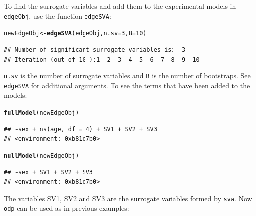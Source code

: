 \documentclass{article}\usepackage[]{graphicx}\usepackage[]{color}
\makeatletter
\newcommand{\hlnum}[1]{\textcolor[rgb]{0.686,0.059,0.569}{#1}}%
\newcommand{\hlstd}[1]{\textcolor[rgb]{0.345,0.345,0.345}{#1}}%
\newcommand{\hlkwb}[1]{\textcolor[rgb]{0.69,0.353,0.396}{#1}}%
\newcommand{\hlkwc}[1]{\textcolor[rgb]{0.333,0.667,0.333}{#1}}%
\newcommand{\hlkwd}[1]{\textcolor[rgb]{0.737,0.353,0.396}{\textbf{#1}}}%
\newenvironment{kframe}{%
 \def\at@end@of@kframe{}%
 \ifinner\ifhmode%
  \def\at@end@of@kframe{\end{minipage}}%
  \begin{minipage}{\columnwidth}%
 \fi\fi%
 \def\FrameCommand##1{\hskip\@totalleftmargin \hskip-\fboxsep
 \colorbox{shadecolor}{##1}\hskip-\fboxsep
     \hskip-\linewidth \hskip-\@totalleftmargin \hskip\columnwidth}%
 \MakeFramed {\advance\hsize-\width
   \@totalleftmargin\z@ \linewidth\hsize
   \@setminipage}}%
 {\par\unskip\endMakeFramed%
 \at@end@of@kframe}
\newenvironment{knitrout}{}{} %
\makeatother
\begin{document}
To find the surrogate variables and add them to the experimental models in {\tt edgeObj}, use the function {\tt edgeSVA}:
\begin{knitrout}
\color{fgcolor}\begin{kframe}
\begin{alltt}
\hlstd{newEdgeObj} \hlkwb{<-} \hlkwd{edgeSVA}\hlstd{(edgeObj,} \hlkwc{n.sv} \hlstd{=} \hlnum{3}\hlstd{,} \hlkwc{B} \hlstd{=} \hlnum{10}\hlstd{)}
\end{alltt}
\begin{verbatim}
## Number of significant surrogate variables is:  3 
## Iteration (out of 10 ):1  2  3  4  5  6  7  8  9  10
\end{verbatim}
\end{kframe}
\end{knitrout}
{\tt n.sv} is the number of surrogate variables and {\tt B} is the number of bootstraps. See {\tt edgeSVA} for additional arguments. To see the terms that have been added to the models:
\begin{knitrout}
\color{fgcolor}\begin{kframe}
\begin{alltt}
\hlkwd{fullModel}\hlstd{(newEdgeObj)}
\end{alltt}
\begin{verbatim}
## ~sex + ns(age, df = 4) + SV1 + SV2 + SV3
## <environment: 0xb81d7b0>
\end{verbatim}
\begin{alltt}
\hlkwd{nullModel}\hlstd{(newEdgeObj)}
\end{alltt}
\begin{verbatim}
## ~sex + SV1 + SV2 + SV3
## <environment: 0xb81d7b0>
\end{verbatim}
\end{kframe}
\end{knitrout}
The variables SV1, SV2 and SV3 are the surrogate variables formed by {\tt sva}. Now {\tt odp} can be used as in previous examples:
\end{document}
